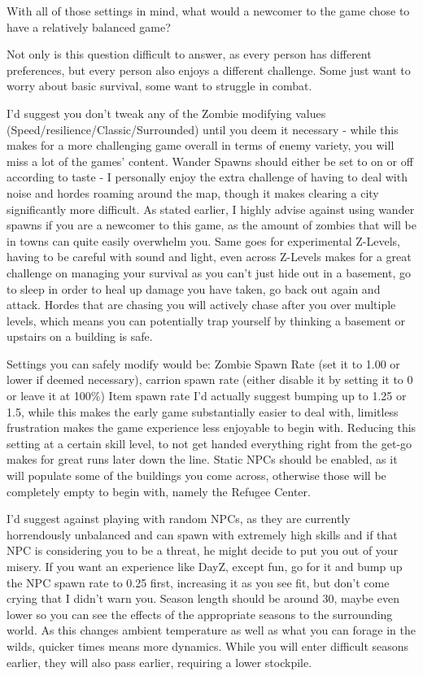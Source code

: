 With all of those settings in mind, what would a newcomer to the game chose to have a relatively balanced game?

Not only is this question difficult to answer, as every person has different preferences, but every person also enjoys a different challenge. Some just want to worry about basic survival, some want to struggle in combat.

I'd suggest you don't tweak any of the Zombie modifying values (Speed/resilience/Classic/Surrounded) until you deem it necessary - while this makes for a more challenging game overall in terms of enemy variety, you will miss a lot of the games' content. Wander Spawns should either be set to on or off according to taste - I personally enjoy the extra challenge of having to deal with noise and hordes roaming around the map, though it makes clearing a city significantly more difficult. As stated earlier, I highly advise against using wander spawns if you are a newcomer to this game, as the amount of zombies that will be in towns can quite easily overwhelm you. Same goes for experimental Z-Levels, having to be careful with sound and light, even across Z-Levels makes for a great challenge on managing your survival as you can't just hide out in a basement, go to sleep in order to heal up damage you have taken, go back out again and attack. Hordes that are chasing you will actively chase after you over multiple levels, which means you can potentially trap yourself by thinking a basement or upstairs on a building is safe.

Settings you can safely modify would be: Zombie Spawn Rate (set it to 1.00 or lower if deemed necessary), carrion spawn rate (either disable it by setting it to 0 or leave it at 100\%) Item spawn rate I'd actually suggest bumping up to 1.25 or 1.5, while this makes the early game substantially easier to deal with, limitless frustration makes the game experience less enjoyable to begin with. Reducing this setting at a certain skill level, to not get handed everything right from the get-go makes for great runs later down the line. Static NPCs should be enabled, as it will populate some of the buildings you come across, otherwise those will be completely empty to begin with, namely the Refugee Center.

I'd suggest against playing with random NPCs, as they are currently horrendously unbalanced and can spawn with extremely high skills and if that NPC is considering you to be a threat, he might decide to put you out of your misery. If you want an experience like DayZ, except fun, go for it and bump up the NPC spawn rate to 0.25 first, increasing it as you see fit, but don't come crying that I didn't warn you.
Season length should be around 30, maybe even lower so you can see the effects of the appropriate seasons to the surrounding world. As this changes ambient temperature as well as what you can forage in the wilds, quicker times means more dynamics. While you will enter difficult seasons earlier, they will also pass earlier, requiring a lower stockpile.

